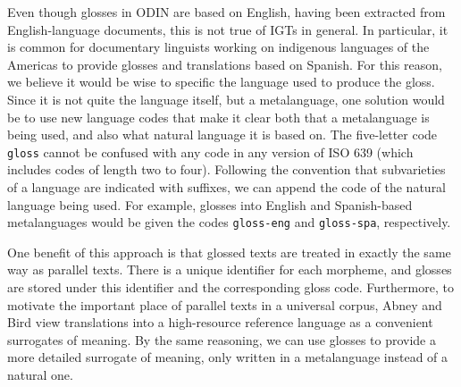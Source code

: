 Even though glosses in ODIN are based on English, having been extracted from English-language documents, this is not true of IGTs in general.  In particular, it is common for documentary linguists working on indigenous languages of the Americas to provide glosses and translations based on Spanish.  For this reason, we believe it would be wise to specific the language used to produce the gloss.  Since it is not quite the language itself, but a metalanguage, one solution would be to use new language codes that make it clear both that a metalanguage is being used, and also what natural language it is based on.  The five-letter code \texttt{gloss} cannot be confused with any code in any version of ISO 639 (which includes codes of length two to four).  Following the convention that subvarieties of a language are indicated with suffixes, we can append the code of the natural language being used.  For example, glosses into English and Spanish-based metalanguages would be given the codes \texttt{gloss-eng} and \texttt{gloss-spa}, respectively.

One benefit of this approach is that glossed texts are treated in exactly the same way as parallel texts.  There is a unique identifier for each morpheme, and glosses are stored under this identifier and the corresponding gloss code.  Furthermore, to motivate the important place of parallel texts in a universal corpus, Abney and Bird view translations into a high-resource reference language as a convenient surrogates of meaning. By the same reasoning, we can use glosses to provide a more detailed surrogate of meaning, only written in a metalanguage instead of a natural one.
